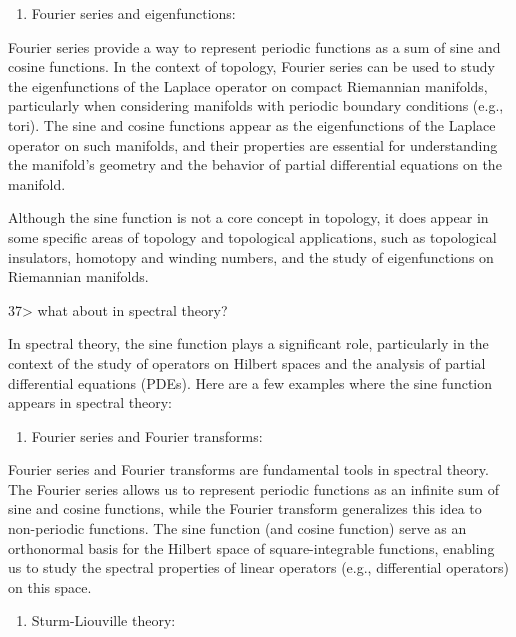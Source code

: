 \documentclass[
]{article}
\providecommand{\tightlist}{%
  \setlength{\itemsep}{0pt}\setlength{\parskip}{0pt}}
\begin{document}
\begin{enumerate}
\def\labelenumi{\arabic{enumi}.}
\setcounter{enumi}{2}
\tightlist
\item
  Fourier series and eigenfunctions:
\end{enumerate}

Fourier series provide a way to represent periodic functions as a sum of
sine and cosine functions. In the context of topology, Fourier series
can be used to study the eigenfunctions of the Laplace operator on
compact Riemannian manifolds, particularly when considering manifolds
with periodic boundary conditions (e.g., tori). The sine and cosine
functions appear as the eigenfunctions of the Laplace operator on such
manifolds, and their properties are essential for understanding the
manifold's geometry and the behavior of partial differential equations
on the manifold.

Although the sine function is not a core concept in topology, it does
appear in some specific areas of topology and topological applications,
such as topological insulators, homotopy and winding numbers, and the
study of eigenfunctions on Riemannian manifolds.

37\textgreater{} what about in spectral theory?

In spectral theory, the sine function plays a significant role,
particularly in the context of the study of operators on Hilbert spaces
and the analysis of partial differential equations (PDEs). Here are a
few examples where the sine function appears in spectral theory:

\begin{enumerate}
\def\labelenumi{\arabic{enumi}.}
\tightlist
\item
  Fourier series and Fourier transforms:
\end{enumerate}

Fourier series and Fourier transforms are fundamental tools in spectral
theory. The Fourier series allows us to represent periodic functions as
an infinite sum of sine and cosine functions, while the Fourier
transform generalizes this idea to non-periodic functions. The sine
function (and cosine function) serve as an orthonormal basis for the
Hilbert space of square-integrable functions, enabling us to study the
spectral properties of linear operators (e.g., differential operators)
on this space.

\begin{enumerate}
\def\labelenumi{\arabic{enumi}.}
\setcounter{enumi}{1}
\tightlist
\item
  Sturm-Liouville theory:
\end{enumerate}
\end{document}
